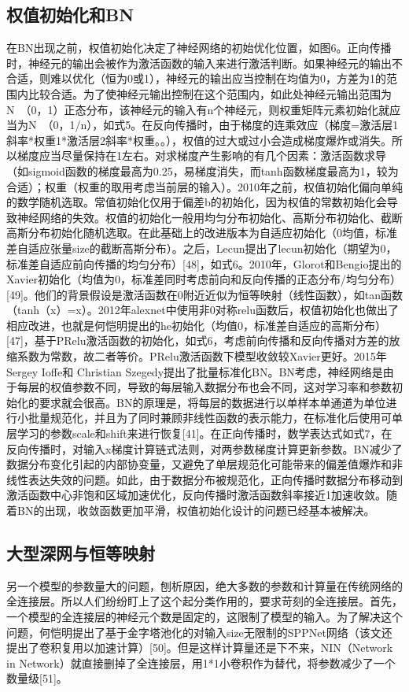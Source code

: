\documentclass[15pt]{article}
\begin{document}
\subsection{权值初始化和BN}
在BN出现之前，权值初始化决定了神经网络的初始优化位置，如图6。正向传播时，神经元的输出会被作为激活函数的输入来进行激活判断。如果神经元的输出不合适，则难以优化（恒为0或1），神经元的输出应当控制在均值为0，方差为1的范围内比较合适。为了使神经元输出控制在这个范围内，如此处神经元输出范围为N~（0，1）正态分布，该神经元的输入有n个神经元，则权重矩阵元素初始化就应当为N~（0，1/n），如式5。在反向传播时，由于梯度的连乘效应（梯度=激活层1斜率*权重1*激活层2斜率*权重。。），权值的过大或过小会造成梯度爆炸或消失。所以梯度应当尽量保持在1左右。对求梯度产生影响的有几个因素：激活函数求导（如sigmoid函数的梯度最高为0.25，易梯度消失，而tanh函数梯度最高为1，较为合适）；权重（权重的取用考虑当前层的输入）。2010年之前，权值初始化偏向单纯的数学随机选取。常值初始化仅用于偏差b的初始化，因为权值的常数初始化会导致神经网络的失效。权值的初始化一般用均匀分布初始化、高斯分布初始化、截断高斯分布初始化随机选取。在此基础上的改进版本为自适应初始化（0均值，标准差自适应张量size的截断高斯分布）。之后，Lecun提出了lecun初始化（期望为0，标准差自适应前向传播的均匀分布）[48]，如式6。2010年，Glorot和Bengio提出的Xavier初始化（均值为0，标准差同时考虑前向和反向传播的正态分布/均匀分布）[49]。他们的背景假设是激活函数在0附近近似为恒等映射（线性函数），如tan函数（tanh（x）=x）。2012年alexnet中使用非0对称relu函数后，权值初始化也做出了相应改进，也就是何恺明提出的he初始化（均值0，标准差自适应的高斯分布）[47]，基于PRelu激活函数的初始化，如式6，考虑前向传播和反向传播对方差的放缩系数为常数，故二者等价。PRelu激活函数下模型收敛较Xavier更好。2015年Sergey Ioffe和 Christian Szegedy提出了批量标准化BN。BN考虑，神经网络是由于每层的权值参数不同，导致的每层输入数据分布也会不同，这对学习率和参数初始化的要求就会很高。BN的原理是，将每层的数据进行以单样本单通道为单位进行小批量规范化，并且为了同时兼顾非线性函数的表示能力，在标准化后使用可单层学习的参数scale和shift来进行恢复[41]。在正向传播时，数学表达式如式7，在反向传播时，对输入x梯度计算链式法则，对两参数梯度计算更新参数。BN减少了数据分布变化引起的内部协变量，又避免了单层规范化可能带来的偏差值爆炸和非线性表达失效的问题。如此，由于数据分布被规范化，正向传播时数据分布移动到激活函数中心非饱和区域加速优化，反向传播时激活函数斜率接近1加速收敛。随着BN的出现，收敛函数更加平滑，权值初始化设计的问题已经基本被解决。

\subsection{大型深网与恒等映射}
另一个模型的参数量大的问题，刨析原因，绝大多数的参数和计算量在传统网络的全连接层。所以人们纷纷盯上了这个起分类作用的，要求苛刻的全连接层。首先，一个模型的全连接层的神经元个数是固定的，这限制了模型的输入。为了解决这个问题，何恺明提出了基于金字塔池化的对输入size无限制的SPPNet网络（该文还提出了卷积复用以加速计算）[50]。但是这样计算量还是下不来，NIN（Network in Network）就直接删掉了全连接层，用1*1小卷积作为替代，将参数减少了一个数量级[51]。
\end{document}
